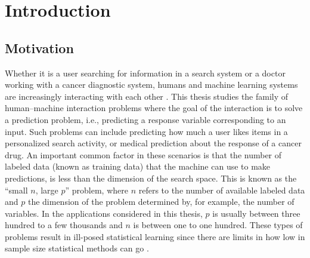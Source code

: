 \documentclass[dissertation,math,vertlayout,pdfa,colorlinks]{aaltoseries}
\begin{document}
\chapter{Introduction}

\section{Motivation}

Whether it is a user searching for information in a search system or a doctor working with a cancer diagnostic system, humans and machine learning systems are increasingly interacting with each other \cite{amershi2014power,chi2019_guideline}. This thesis studies the family of human--machine interaction problems where the goal of the interaction is to solve a prediction problem, i.e., predicting a response variable corresponding to an input. Such problems can include predicting how much a user likes items in a personalized search activity, or medical prediction about the response of a cancer drug. An important common factor in these scenarios is that the number of labeled data (known as training data) that the machine can use to make predictions, is less than the dimension of the search space. This is known as the ``small $n$, large $p$'' problem, where $n$ refers to the number of available labeled data and $p$ the dimension of the problem determined by, for example, the number of variables. In the applications considered in this thesis, $p$ is usually between three hundred to a few thousands and $n$ is between one to one hundred. These types of problems result in ill-posed statistical learning since there are limits in how low in sample size statistical methods can go \cite{Donoho2009observed}.  
 

\end{document}
